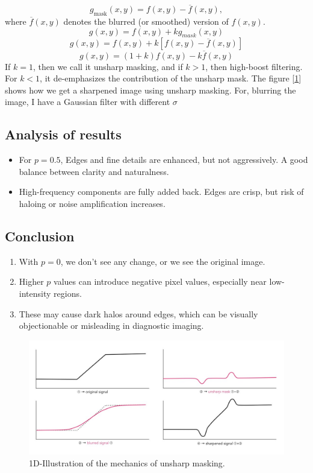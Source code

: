 \documentclass[12pt]{article}
\begin{document}
\begin{equation}
g_{\text{mask}}(x,y) = f(x,y) - \overline{f}(x,y),
\end{equation}
where $\overline{f}(x,y)$ denotes the blurred (or smoothed) version of $f(x,y)$.
\begin{equation}
    g(x,y) = f(x,y)  + kg_{mask}(x,y)
\end{equation}
\[
g(x,y) = f(x,y) + k[f(x,y)-\overline{f}(x,y)]
\]
\begin{equation}
    g(x,y) = (1+k)f(x,y) -k\overline{f}(x,y)
\end{equation}
\noindent
If $k=1$, then we call it unsharp masking, and if $k>1$, then high-boost filtering. For $k<1$, it de-emphasizes the contribution of the unsharp mask. 
The figure [\ref{unsharp}] shows how we get a sharpened image using unsharp masking.
For, blurring the image, I have a Gaussian filter with different $\sigma$
\subsection{Analysis of results}
\begin{itemize}
    \item For $p=0.5$, Edges and fine details are enhanced, but not aggressively. A good balance between clarity and naturalness.
    \item High-frequency components are fully added back. Edges are crisp, but risk of haloing or noise amplification increases.
\end{itemize}
\subsection{Conclusion}
\begin{enumerate}
    \item With $p=0$, we don't see any change, or we see the original image.
    \item Higher $p$ values can introduce negative pixel values, especially near low-intensity regions.
    \item These may cause dark halos around edges, which can be visually objectionable or misleading in diagnostic imaging.
\end{enumerate}
\begin{figure}[h]
    \centering
    \includegraphics[width=1\linewidth]{unsharp.png}
    \caption{1D-Illustration of the mechanics of unsharp masking.}
    \label{unsharp}
\end{figure}
\end{document}
